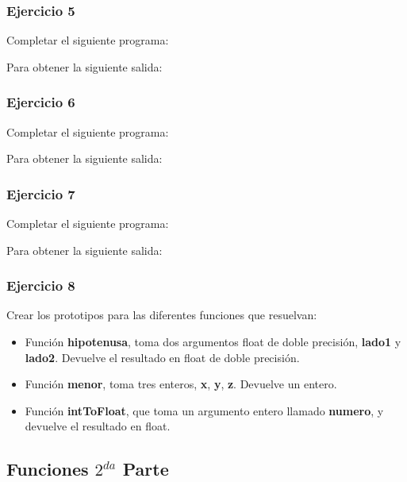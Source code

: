 \subsubsection{Ejercicio 5}
Completar el siguiente programa:
\lstset{inputencoding=utf8/latin1}

Para obtener la siguiente salida:
{\small
  \lstset{inputencoding=utf8/latin1}
  
}


\subsubsection{Ejercicio 6} 
Completar el siguiente programa:
\lstset{inputencoding=utf8/latin1}

Para obtener la siguiente salida:
{\small
  \lstset{inputencoding=utf8/latin1}
  
}

\subsubsection{Ejercicio 7} 
Completar el siguiente programa:
\lstset{inputencoding=utf8/latin1}

Para obtener la siguiente salida:
{\small
  \lstset{inputencoding=utf8/latin1}
  
}

\subsubsection{Ejercicio 8} 
Crear los prototipos para las diferentes funciones que resuelvan:
\begin{itemize}
  \item Función \textbf{hipotenusa}, toma dos argumentos float de doble precisión, \textbf{lado1} y \textbf{lado2}. Devuelve el resultado en float de doble precisión.
  \item Función \textbf{menor}, toma tres enteros, \textbf{x}, \textbf{y}, \textbf{z}. Devuelve un entero.
  \item Función \textbf{intToFloat}, que toma un argumento entero llamado \textbf{numero}, y devuelve el resultado en float.
\end{itemize}


\subsection*{Funciones $2^{da}$ Parte} 

